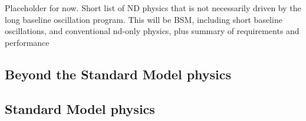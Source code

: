 Placeholder for now.  Short list of ND physics that is not necessarily driven by the long baseline oscillation program.  This will be BSM, including short baseline oscillations, and conventional nd-only physics, plus summary of requirements and performance

\subsection{Beyond the Standard Model physics}
\label{ssec:exsum-nd-ndphys-bsm}

\subsection{Standard Model physics}
\label{sec:exsum-nd-ndphys-sm}

